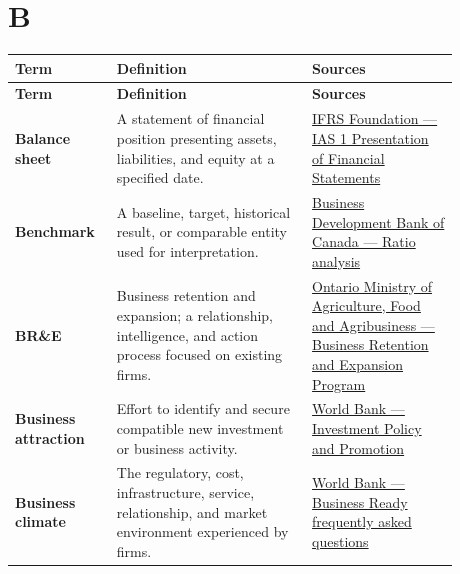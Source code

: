 \documentclass[11pt,letterpaper,oneside,openany]{book}
\begin{document}
\section[B]{B}
\begin{center}
\small
\setlength{\LTpre}{0.4em}
\setlength{\LTpost}{0.8em}
\begin{longtable}{>{\RaggedRight\arraybackslash}p{0.180\linewidth}>{\RaggedRight\arraybackslash}p{0.400\linewidth}>{\RaggedRight\arraybackslash}p{0.300\linewidth}}
\rowcolor{DeepNavy}
\color{white}\bfseries Term & \color{white}\bfseries Definition & \color{white}\bfseries Sources \\
\endfirsthead
\rowcolor{DeepNavy}
\color{white}\bfseries Term & \color{white}\bfseries Definition & \color{white}\bfseries Sources \\
\endhead
\textbf{Balance sheet} & A statement of financial position presenting assets, liabilities, and equity at a specified date. & \href{https://www.ifrs.org/issued-standards/list-of-standards/ias-1-presentation-of-financial-statements.html/}{IFRS Foundation --- IAS 1 Presentation of Financial Statements} \\
\textbf{Benchmark} & A baseline, target, historical result, or comparable entity used for interpretation. & \href{https://www.bdc.ca/en/articles-tools/entrepreneur-toolkit/templates-business-guides/glossary/ratio-analysis}{Business Development Bank of Canada --- Ratio analysis} \\
\textbf{BR\&E} & Business retention and expansion; a relationship, intelligence, and action process focused on existing firms. & \href{https://www.ontario.ca/page/business-retention-and-expansion-program}{Ontario Ministry of Agriculture, Food and Agribusiness --- Business Retention and Expansion Program} \\
\textbf{Business attraction} & Effort to identify and secure compatible new investment or business activity. & \href{https://www.worldbank.org/en/topic/investment-climate/brief/investment-policy-and-promotion}{World Bank --- Investment Policy and Promotion} \\
\textbf{Business climate} & The regulatory, cost, infrastructure, service, relationship, and market environment experienced by firms. & \href{https://www.worldbank.org/en/businessready/about-us/faq}{World Bank --- Business Ready frequently asked questions} \\
\end{longtable}
\end{center}
\end{document}
